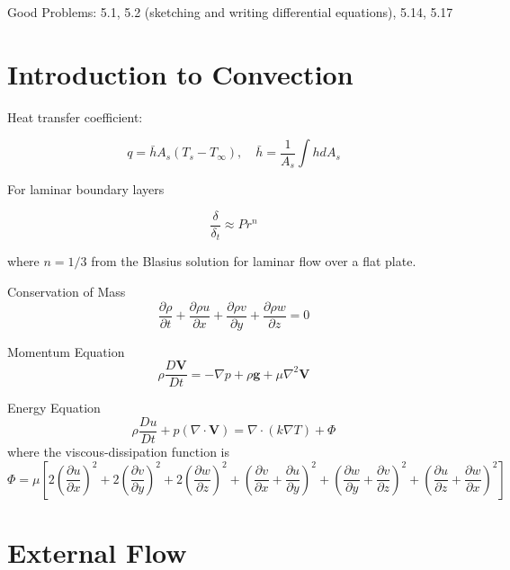 \documentclass[paper=letter, fontsize=11pt]{scrartcl}
\numberwithin{equation}{section}        %
\numberwithin{figure}{section}          %
\numberwithin{table}{section}               %
\begin{document}
\bigskip Good Problems: 5.1, 5.2 (sketching and writing differential equations), 5.14, 5.17


\section{Introduction to Convection}
Heat transfer coefficient:

\begin{equation}
q = \bar h A_s(T_s-T_\infty), \quad \bar h = \frac{1}{A_s}\int hdA_s
\end{equation}

For laminar boundary layers

\begin{equation}
\frac{\delta}{\delta_t} \approx Pr^n
\end{equation}

\noindent where $n=1/3$ from the Blasius solution for laminar flow over a flat plate.

Conservation of Mass
\begin{equation}
  \frac{\partial\rho}{\partial t} + \frac{\partial\rho u}{\partial x} +\frac{\partial\rho v}{\partial y} +\frac{\partial\rho w}{\partial z} = 0
\end{equation}

Momentum Equation
\begin{equation}
  \rho\frac{D\mathbf{V}}{Dt} = -\nabla p + \rho\mathbf{g} + \mu \nabla^2\mathbf{V}
\end{equation}

Energy Equation
\begin{equation}
  \rho\frac{Du}{Dt} + p (\nabla \cdot \mathbf{V}) = \nabla\cdot(k\nabla T) + \Phi
\end{equation}
\noindent where the viscous-dissipation function is
\begin{equation}
    \Phi = \mu\left[ 2\left(\frac{\partial u}{\partial x}\right)^2 + 2\left(\frac{\partial v}{\partial y}\right)^2 + 2\left(\frac{\partial w}{\partial z}\right)^2 + \left(\frac{\partial v}{\partial x} + \frac{\partial u}{\partial y} \right)^2 + \left(\frac{\partial w}{\partial y} + \frac{\partial v}{\partial z} \right)^2 + \left(\frac{\partial u}{\partial z} + \frac{\partial w}{\partial x} \right)^2 \right]
\end{equation}

\section{External Flow}
\end{document}
